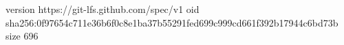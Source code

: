 version https://git-lfs.github.com/spec/v1
oid sha256:0f97654c711e36b6f0c8e1ba37b55291fed699c999cd661f392b17944c6bd73b
size 696

